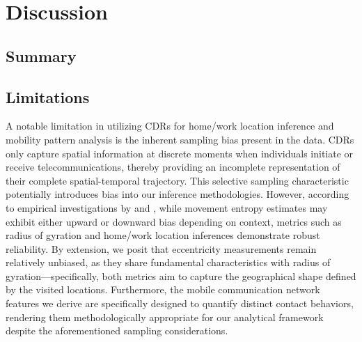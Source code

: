 
\chapter{Discussion}
\section{Summary}

\section{Limitations}
A notable limitation in utilizing CDRs for home/work location inference and mobility pattern analysis is the inherent sampling bias present in the data. CDRs only capture spatial information at discrete moments when individuals initiate or receive telecommunications, thereby providing an incomplete representation of their complete spatial-temporal trajectory. This selective sampling characteristic potentially introduces bias into our inference methodologies. However, according to empirical investigations by \cite{ranjan2012call} and \cite{zhao2016understanding}, while movement entropy estimates may exhibit either upward or downward bias depending on context, metrics such as radius of gyration and home/work location inferences demonstrate robust reliability. By extension, we posit that eccentricity measurements remain relatively unbiased, as they share fundamental characteristics with radius of gyration—specifically, both metrics aim to capture the geographical shape defined by the visited locations. Furthermore, the mobile communication network features we derive are specifically designed to quantify distinct contact behaviors, rendering them methodologically appropriate for our analytical framework despite the aforementioned sampling considerations.

